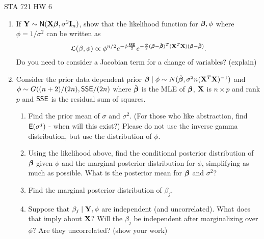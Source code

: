 \documentclass{article}
\begin{document}
\begin{center}
  STA 721 HW 6
\end{center}


\begin{enumerate}
\item If $\mathbf{Y} \sim \textsf{N}(\mathbf{X}\boldsymbol{\beta}, \sigma^2 \mathbf{I}_n)$, show that the likelihood
  function for $\boldsymbol{\beta}, \phi$ where $\phi = 1/\sigma^2$ can be written as 
 $${\cal{L}}(\beta, \phi) \propto \phi^{n/2} e^{- \phi \frac{\textsf{SSE}}{2}}
e^{-\frac{\phi}{2} (\boldsymbol{\beta} - \hat{\boldsymbol{\beta}})^T(\mathbf{X}^T\mathbf{X}) (\boldsymbol{\beta} - \hat{\boldsymbol{\beta}})}.$$   Do you
need to consider a Jacobian term for a change of variables?  (explain)

\item Consider the prior data dependent prior $\boldsymbol{\beta} \mid \phi \sim N(\hat{\boldsymbol{\beta}}, \sigma^2 n
  (\mathbf{X}^T\mathbf{X})^{-1})$ and   $\phi \sim G((n + 2)/(2n), \textsf{SSE}/(2n)$
where $\hat{\boldsymbol{\beta}}$ is the MLE of $\boldsymbol{\beta}$, $\mathbf{X}$ is $n \times p$ and rank $p$
and $\textsf{SSE}$ is the residual sum of squares.
  \begin{enumerate}
  \item  Find the prior mean of $\sigma$ and $\sigma^2$.  (For those
    who like abstraction, find $\textsf{E}(\sigma^j)$ - when will this exist?)
    Please do not use the inverse gamma distribution, but use the
    distribution of $\phi$.
  \item  Using the likelihood above, find the conditional posterior distribution of $\boldsymbol{\beta}$ given
    $\phi$ and the marginal posterior distribution for $\phi$,
    simplifying as much as possible.  What
    is the posterior mean for $\boldsymbol{\beta}$ and $\sigma^2$?   
  \item Find the marginal posterior distribution of $\beta_j$.
  \item Suppose that $\beta_j \mid \mathbf{Y}, \phi$ are independent (and
    uncorrelated).  What does that imply about $\mathbf{X}$?  Will the
    $\beta_j$ be independent after marginalizing over $\phi$?  Are
    they uncorrelated?  (show your work)
  \end{enumerate}
\end{enumerate}
\end{document}
